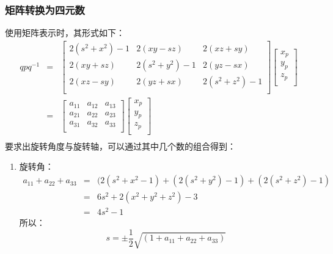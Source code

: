 \documentclass[a4paper,10pt]{article}
\begin{document}
\begin{CJK}{UTF8}{song}
\subsubsection{矩阵转换为四元数}
使用矩阵表示时，其形式如下：
\begin{displaymath}
\begin{array}{ccl}
qpq^{-1}& = &\left[
\begin{array}{ccc}
2(s^2+x^2)-1 & 2(xy-sz) & 2(xz+sy)  \\
2(xy+sz)  &  2(s^2+y^2)-1 & 2(yz-sx) \\
2(xz-sy) & 2(yz+sx) & 2(s^2+z^2)-1 \\  
\end{array}\right]
\left[
\begin{array}{c}
x_p \\
y_p \\
z_p \\       
\end{array}\right] \\
  &= &
\left[
\begin{array}{ccc}
a_{11} & a_{12} & a_{13} \\
a_{21} & a_{22} & a_{23} \\
a_{31} & a_{32} & a_{33} \\
\end{array}
\right]
\left[\begin{array}{c}
x_p \\
y_p \\
z_p \\       
\end{array}\right] \\
\end{array}
\end{displaymath}
要求出旋转角度与旋转轴，可以通过其中几个数的组合得到：
\begin{enumerate}
 \item 旋转角：
\begin{displaymath}
\begin{array}{ccl}
a_{11}+a_{22}+a_{33} & = & (2(s^2+x^2-1)+(2(s^2+y^2)-1)+(2(s^2+z^2)-1)   \\
                     & = & 6s^2+2(x^2+y^2+z^2)-3   \\
                     & = & 4s^2-1
\end{array}
\end{displaymath}
所以：
\begin{displaymath}
s=\pm{}\frac{1}{2}\sqrt{(1+a_{11}+a_{22}+a_{33})}
\end{displaymath}

\end{enumerate}
\end{CJK}
\end{document}
